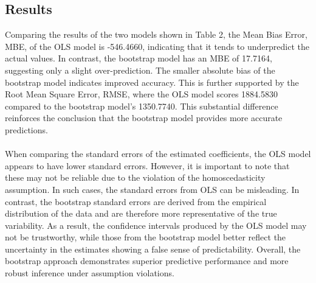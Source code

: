 \subsection{Results}
Comparing the results of the two models shown in Table 2, the Mean Bias Error, MBE, of the OLS model is -546.4660, indicating that it tends to underpredict the actual values. In contrast, the bootstrap model has an MBE of 17.7164, suggesting only a slight over-prediction. The smaller absolute bias of the bootstrap model indicates improved accuracy. This is further supported by the Root Mean Square Error, RMSE, where the OLS model scores 1884.5830 compared to the bootstrap model’s 1350.7740. This substantial difference reinforces the conclusion that the bootstrap model provides more accurate predictions.
\\\\
When comparing the standard errors of the estimated coefficients, the OLS model appears to have lower standard errors. However, it is important to note that these may not be reliable due to the violation of the homoscedasticity assumption. In such cases, the standard errors from OLS can be misleading. In contrast, the bootstrap standard errors are derived from the empirical distribution of the data and are therefore more representative of the true variability. As a result, the confidence intervals produced by the OLS model may not be trustworthy, while those from the bootstrap model better reflect the uncertainty in the estimates showing a false sense of predictability. Overall, the bootstrap approach demonstrates superior predictive performance and more robust inference under assumption violations.
\\



